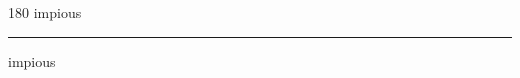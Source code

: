 
\begin{frame}
\begin{center}
\begin{turn}{180}
{\fontsize{2.5cm}{1em}\selectfont impious}
\end{turn}
\vspace{1em}\par  
\hrule
\vspace{1em}\par  
{\fontsize{2.5cm}{1em}\selectfont impious}
\end{center}
\end{frame}

